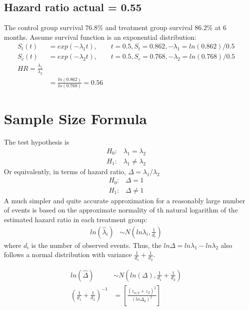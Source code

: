 \documentclass[11pt]{article} %
\begin{document}
	\subsection{Hazard ratio actual = 0.55}
The control group survival $76.8\%$ and treatment group survival $86.2\%$ at 6 months. 
Assume survival function is an exponential distribution:
\begin{align*}
	S_t(t) &= exp(-\lambda_1 t), \qquad t= 0.5, S_t = 0.862 , -\lambda_1 = ln(0.862)/0.5\\
	S_c(t) &=  exp(-\lambda_2 t), \qquad t= 0.5, S_c = 0.768, -\lambda_2 = ln(0.768)/0.5  \\
	HR = \frac{\lambda_1}{\lambda_2}\\
	&= \frac{ln(0.862)}{ln(0.768)} = 0.56
\end{align*}


	\section{Sample Size Formula}
	The test hypothesis is 
\begin{align*}
	H_0: & \lambda_1 = \lambda_2\\
	H_1: & \lambda_1 \neq \lambda_2
\end{align*}	
Or equivalently, in terms of hazard ratio, $\Delta = \lambda_1/\lambda_2$
\begin{align*}
	H_0: & \Delta = 1\\
	H_1: & \Delta \neq 1
\end{align*}
A much simpler and quite accurate approximation for a reasonably large number of events is based on the approximate normality of th natural logarithm of the estimated hazard ratio in each treatment group:
\begin{align*}
	ln(\hat{\lambda}_i) & \sim  N(ln \lambda_i, \frac{1}{d_i})
\end{align*}
where $d_i$ is the number of observed events. Thus, the $ln \Delta = ln \lambda_1 - ln \lambda_2$ also follows a normal distribution with variance $\frac{1}{d_1} + \frac{1}{d_2}$.

\begin{align*}
	ln (\hat{\Delta}) & \sim N\left(ln(\Delta),  \frac{1}{d_1} + \frac{1}{d_2} \right) \\
	\left( \frac{1}{d_1} + \frac{1}{d_2} \right)^{-1} &= \left[ \frac{(z_{\alpha/2} + z_{\beta})^2}{(ln \Delta_0)^2} \right] 
\end{align*}
\end{document}
